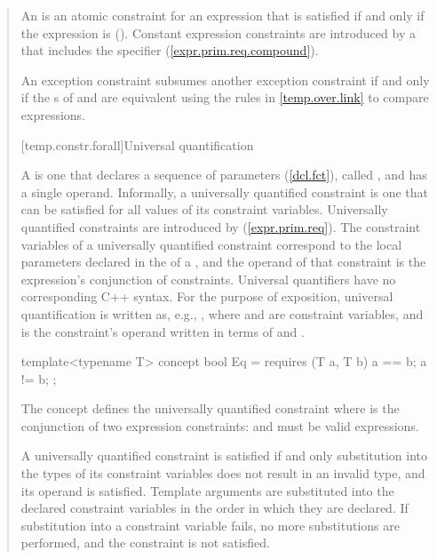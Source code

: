 \begin{quote}
\pnum
An  is an atomic constraint
for an expression  that is satisfied if and only
if the expression  is 
().
% 
\enternote
Constant expression constraints are introduced by a
 that
includes the  specifier
(\ref{expr.prim.req.compound}).
\exitnote

\pnum
An exception constraint  subsumes another
exception constraint  if and only if the
s of 
and  are equivalent using the rules in \ref{temp.over.link}
to compare expressions.



[temp.constr.forall]{Universal quantification}

\pnum
A  is one that declares a sequence
of parameters (\ref{dcl.fct}), called , and has a 
single operand. 
% 
Informally, a universally quantified constraint is one that can be satisfied
for all values of its constraint variables.
% 
\enternote
Universally quantified constraints are introduced by 
 (\ref{expr.prim.req}). The constraint 
variables of a universally quantified constraint correspond to the local 
parameters declared in the  of a
, and the operand of that constraint
is the expression's conjunction of constraints.
\exitnote
% 
\enternote 
Universal quantifiers have no corresponding C++ syntax. For the purpose of 
exposition, universal quantification is written as, e.g.,
, where  and  are
constraint variables, and  is the constraint's operand
written in terms of  and .
\exitnote
% 
\enterexample
\begin{codeblock}
template<typename T>
  concept bool Eq = requires (T a, T b) {
    a == b;
    a != b;
  };
\end{codeblock}
The concept  defines the universally quantified constraint
 where  is the conjunction
of two expression constraints:  and  must be
valid expressions.
\exitexample

\pnum
A universally quantified constraint is satisfied if and only substitution into 
the types of its constraint variables does not result in an invalid type, and its
operand is satisfied. Template arguments are substituted into the declared
constraint variables in the order in which they are declared. If substitution 
into a constraint variable fails, no more substitutions are performed, and
the constraint is not satisfied.


\end{quote}
